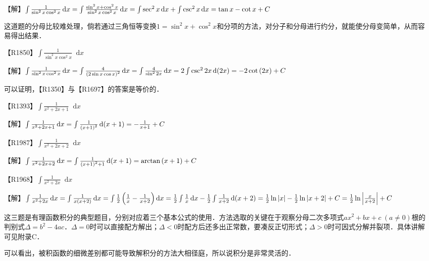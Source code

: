 \documentclass{ctexbook}
\newcommand*{\dif}{\mathop{}\!\mathrm{d}}
\begin{document}
【解】$\int\frac{1}{\sin^{2}{x}\cos^{2}{x}}\dif{x}\\=\int\frac{\sin^{2}{x}+\cos^{2}{x}}{\sin^{2}{x}\cos^{2}{x}}\dif{x}\\=\int\sec^{2}{x}\dif{x}+\int\csc^{2}{x}\dif{x}\\=\tan{x}-\cot{x}+C$\par
{\kaishu 这道题的分母比较难处理，倘若通过三角恒等变换$1=\sin^{2}{x}+\cos^{2}{x}$和分项的方法，对分子和分母进行约分，就能使分母变简单，从而容易得出结果．}\par
【R1850】$\int\frac{1}{\sin^{2}{x}\cos^{2}{x}}\dif{x}$\par
【解】$\int\frac{1}{\sin^{2}{x}\cos^{2}{x}}\dif{x}\\=\int\frac{4}{\left(2\sin{x}\cos{x}\right)^{2}}\dif{x}\\=\int\frac{4}{\sin^{2}{2x}}\dif{x}\\=2\int\csc^{2}{2x}\dif{(2x)}\\=-2\cot{(2x)}+C$\par
{\kaishu 可以证明，【R1350】与【R1697】的答案是等价的．}\par
【R1393】$\int\frac{1}{x^{2}+2x+1}\dif{x}$\par
【解】$\int\frac{1}{x^{2}+2x+1}\dif{x}\\=\int\frac{1}{\left(x+1\right)^{2}}\dif{\left(x+1\right)}\\=-\frac{1}{x+1}+C$\par
【R1987】$\int\frac{1}{x^{2}+2x+2}\dif{x}$\par
【解】$\int\frac{1}{x^{2}+2x+2}\dif{x}\\=\int\frac{1}{\left(x+1\right)^{2}+1}\dif{\left(x+1\right)}\\=\arctan{\left(x+1\right)}+C$\par
【R1968】$\int\frac{1}{x^{2}+2x}\dif{x}$\par
【解】$\int\frac{1}{x^{2}+2x}\dif{x}\\=\int\frac{1}{x\left(x+2\right)}\dif{x}\\=\int\frac{1}{2}\left(\frac{1}{x}-\frac{1}{x+2}\right)\dif{x}\\=\frac{1}{2}\int\frac{1}{x}\dif{x}-\frac{1}{2}\int\frac{1}{x+2}\dif{\left(x+2\right)}\\=\frac{1}{2}\ln{\left|x\right|}-\frac{1}{2}\ln{\left|x+2\right|}+C\\=\frac{1}{2}\ln{\left|\frac{x}{x+2}\right|}+C$\par
{\kaishu 这三题是有理函数积分的典型题目，分别对应着三个基本公式的使用．方法选取的关键在于观察分母二次多项式$ax^{2}+bx+c\;(a\ne0)$根的判别式$\Delta=b^{2}-4ac$．$\Delta=0$时可以直接配方解出；$\Delta<0$时配方后还多出正常数，要凑反正切形式；$\Delta>0$时可因式分解并裂项．具体讲解可见附录C．\par
可以看出，被积函数的细微差别都可能导致解积分的方法大相径庭，所以说积分是非常灵活的．}\par
\end{document}

